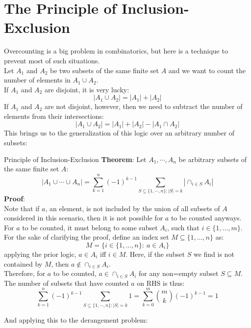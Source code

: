 \section{The Principle of Inclusion-Exclusion}
Overcounting is a big problem in combinatorics, but here is a technique to prevent most of such situations. \\
Let $A_1$ and $A_2$ be two subsets of the same finite set $A$ and we want to count the number of elements in $A_1 \cup A_2$. \\
If $A_1$ and $A_2$ are disjoint, it is very lucky:
\[|A_1 \cup A_2| = |A_1| + |A_2|\]
If $A_1$ and $A_2$ are not disjoint, however, then we need to subtract the number of elements from their intersections:
\[|A_1 \cup A_2| = |A_1| + |A_2| - |A_1 \cap A_2|\]
This brings us to the generalization of this logic over an arbitrary number of subsets:
\begin{ln-theorem}{Principle of Inclusion-Exclusion}{}
    \textbf{Theorem}: Let $A_1, \cdots, A_n$ be arbitrary subsets of the same finite set $A$:
    \[|A_1 \cup \cdots \cup A_n| = \sum_{k = 1}^n {(-1)}^{k - 1} \sum_{S \subseteq \{1, \cdots, n\}:|S| = k} |\cap_{i \in S}A_i|\]
    \tcblower
    \textbf{Proof}: \\
    Note that if $a$, an element, is not included by the union of all subsets of $A$ considered in this scenario, then it is not possible for $a$ to be counted anyways. \\
    For $a$ to be counted, it must belong to some subset $A_i$, such that $i \in \{1, \dots, m\}$. \\
    For the sake of clarifying the proof, define an index set $M \subseteq \{1, \dots, n\}$ as:
    \[M = \{i \in \{1, \dots, n\}:\ a \in A_i\}\]
    applying the prior logic, $a \in A_i$ iff $i \in M$. Here, if the subset $S$ we find is not contained by $M$, then $a \notin \cap_{i \in S}A_i$. \\
    Therefore, for $a$ to be counted, $a \in \cap_{i \in S}A_i$ for any non=empty subset $S \subseteq M$. The number of subsets that have counted $a$ on RHS is thus:
    \[\sum_{k = 1}^n {(-1)}^{k - 1} \sum_{S \subseteq \{1, \cdots, n\}:|S| = k} 1 = \sum_{k = 0}^m \binom{m}{k} {(-1)}^{k - 1} = 1\]
\end{ln-theorem}
And applying this to the derangement problem:
